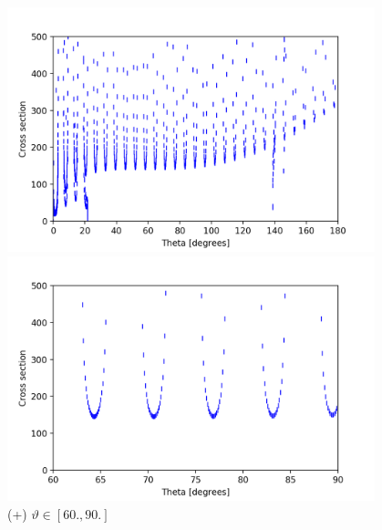 \documentclass[a4paper,12pt]{article}
\begin{document}
\begin{figure}[H]
	\centering
	\begin{minipage}{0.5\textwidth}
		\centering
		\includegraphics[width=0.95\textwidth]{./cross-pot-co1.png}
		\caption{ (+) $\vartheta \in [0., 180.]$ }
	\end{minipage}\hfill
	\begin{minipage}{0.5\textwidth}
		\centering
		\includegraphics[width=0.95\textwidth]{./cross-pot-co2.png}
		\caption{ (+) $\vartheta \in [60., 90.]$}
	\end{minipage}
\end{figure}
\end{document}
